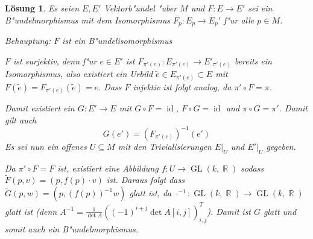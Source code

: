 \documentclass[paper=A4, twoside, chapterprefix=true, bibliography=totoc, headsepline]{scrbook}
\DeclareMathOperator{\R}{\mathbb{R}}
\DeclareMathOperator{\GL}{GL} %
\DeclareMathOperator{\Id}{id} %
\newcommand{\X}{\times}
\theoremstyle{plain}
\theoremstyle{nonumberplain}
\theoremstyle{empty}
\theoremstyle{break}
\newtheorem{Loes}{L\"osung}
\begin{document}
\begin{Loes}
Es seien $E, E'$ Vektorb"undel "uber $M$ und $F: E \to E'$ sei ein B"undelmorphismus mit dem Isomorphismus $F_p: E_p \to E_p'$ f"ur alle $p \in M$.

\emph{Behauptung:} $F$ ist ein B"undelisomorphismus

$F$ ist surjektiv, denn f"ur $e \in E'$ ist $F_{\pi'(e)}: E_{\pi'(e)} \to E'_{\pi'(e)}$ bereits ein Isomorphismus, also existiert ein Urbild $\tilde e \in E_{\pi'(e)} \subset E$ mit $F(\tilde e) = F_{\pi'(e)}(\tilde e) = e$. Dass $F$ injektiv ist folgt analog, da $\pi' \circ F = \pi$.

Damit existiert ein $G: E' \to E$ mit $G \circ F = \Id$, $F \circ G = \Id$ und $\pi \circ G = \pi'$. Damit gilt auch
	\[ G(e') = (F_{\pi'(e)})^{-1}(e') \]
Es sei nun ein offenes $U  \subseteq M$ mit den Trivialisierungen $E|_U$ und $E'|_U$ gegeben.
\begin{center}\end{center}
Da $\pi' \circ F = F$ ist, existiert eine Abbildung $f: U \to \GL(k, \R)$ sodass $\tilde F(p,v) = (p, f(p) \cdot v)$ ist. Daraus folgt dass $\tilde G(p,w) = (p, (f(p))^{-1}w)$ glatt ist, da $\cdot^{-1}: \GL(k,\R) \to \GL(k, \R)$ glatt ist (denn $A^{-1} = \frac{1}{\det A}((-1)^{i+j} \det A[i,j])_{i,j}^T$). Damit ist $G$ glatt und somit auch ein B"undelmorphismus.
\end{Loes}
\end{document}
